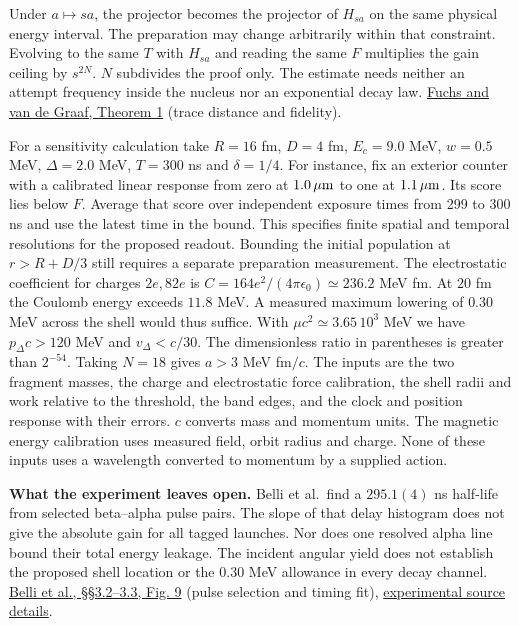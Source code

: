 \documentclass[11pt,a4paper]{article}
\begin{document}
Under \(a\mapsto s a\), the projector becomes the projector of
\(H_{sa}\) on the same physical energy interval. The preparation may
change arbitrarily within that constraint. Evolving to the same \(T\)
with \(H_{sa}\) and reading the same \(F\) multiplies the gain ceiling
by \(s^{2N}\). \(N\) subdivides the proof only. The estimate needs
neither an attempt frequency inside the nucleus nor an exponential decay
law. \href{https://arxiv.org/abs/quant-ph/9712042}{Fuchs and van de
Graaf, Theorem 1} (trace distance and fidelity).

For a sensitivity calculation take \(R=16\) fm, \(D=4\) fm, \(E_c=9.0\)
MeV, \(w=0.5\) MeV, \(\Delta=2.0\) MeV, \(T=300\) ns and \(\delta=1/4\).
For instance, fix an exterior counter with a calibrated linear response
from zero at \(1.0\,\mu{\rm m}\) to one at \(1.1\,\mu{\rm m}\). Its
score lies below \(F\). Average that score over independent exposure
times from 299 to 300 ns and use the latest time in the bound. This
specifies finite spatial and temporal resolutions for the proposed
readout. Bounding the initial population at \(r>R+D/3\) still requires a
separate preparation measurement. The electrostatic coefficient for
charges \(2e,82e\) is \(C=164e^2/(4\pi\epsilon_0)\simeq236.2\) MeV fm.
At \(20\) fm the Coulomb energy exceeds \(11.8\) MeV. A measured maximum
lowering of \(0.30\) MeV across the shell would thus suffice. With
\(\mu c^2\simeq3.65\,10^3\) MeV we have \(p_\Delta c>120\) MeV and
\(v_\Delta<c/30\). The dimensionless ratio in parentheses is greater
than \(2^{-54}\). Taking \(N=18\) gives \(a>3\) MeV fm\(/c\). The inputs
are the two fragment masses, the charge and electrostatic force
calibration, the shell radii and work relative to the threshold, the
band edges, and the clock and position response with their errors. \(c\)
converts mass and momentum units. The magnetic energy calibration uses
measured field, orbit radius and charge. None of these inputs uses a
wavelength converted to momentum by a supplied action.

\textbf{What the experiment leaves open.} Belli et al.~find a
\(295.1(4)\) ns half-life from selected beta--alpha pulse pairs. The
slope of that delay histogram does not give the absolute gain for all
tagged launches. Nor does one resolved alpha line bound their total
energy leakage. The incident angular yield does not establish the
proposed shell location or the \(0.30\) MeV allowance in every decay
channel. \href{https://arxiv.org/pdf/2107.04233v1}{Belli et al.,
§§3.2--3.3, Fig. 9} (pulse selection and timing fit),
\href{../docs/Polonium212_AlphaEscape.md}{experimental source details}.
\end{document}
